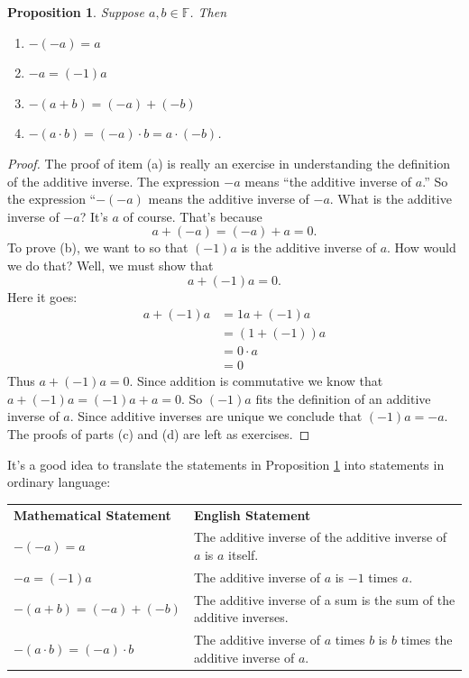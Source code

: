 \documentclass[11pt]{article}
\newtheorem{proposition}[theorem]{Proposition}
\theoremstyle{definition}
\begin{document}
\begin{proposition}
  Suppose $a,b\in\mathbb{F}$. Then
  \begin{enumerate}
    \item[(a)] $-(-a) = a$
    \item[(b)] $-a = (-1)a$
    \item[(c)] $-(a+b)=(-a) + (-b)$
    \item[(d)] $-(a\cdot b) = (-a)\cdot b = a\cdot (-b)$.
  \end{enumerate}\label{prop: additive inverses}
\end{proposition}
\begin{proof}
The proof of item (a) is really an exercise in understanding the definition of the additive inverse. The expression $-a$ means ``the additive inverse
of $a$.'' So the expression ``$-(-a)$ means the additive inverse of $-a$. What is the additive inverse of $-a$? It's $a$ of course. That's because
\[ a + (-a) = (-a) + a = 0.\]
To prove (b), we want to so that $(-1)a$ is the additive inverse of $a$. How would we do that? Well, we must show that
\[ a + (-1)a = 0.\]
Here it goes:
\begin{align*}
  a + (-1)a &= 1a + (-1)a\\
            &= (1 + (-1))a\\
            &= 0\cdot a\\
            &= 0
\end{align*}
Thus $a+(-1)a =0$. Since addition is commutative we know that $a+(-1)a=(-1)a+a=0$. So $(-1)a$ fits the definition of an additive inverse of $a$. Since 
additive inverses are unique we conclude that $(-1)a=-a$. The proofs of parts (c) and (d) are left as exercises.
\end{proof}

It's a good idea to translate the statements in Proposition \ref{prop: additive inverses} into statements in ordinary language:
\begin{center}
  \begin{tabular}[]{ll}
    \textbf{Mathematical Statement} & \textbf{English Statement} \\
   $-(-a)=a$ & The additive inverse of the additive inverse of $a$ is $a$ itself.\\
   $-a = (-1)a$ & The additive inverse of $a$ is $-1$ times $a$.\\
   $-(a+b)=(-a)+(-b)$ & The additive inverse of a sum is the sum of the additive inverses.\\
   $-(a\cdot b) = (-a)\cdot b$  & The additive inverse of $a$ times $b$ is $b$ times the additive inverse of $a$. 
  \end{tabular}
\end{center}
\end{document}
